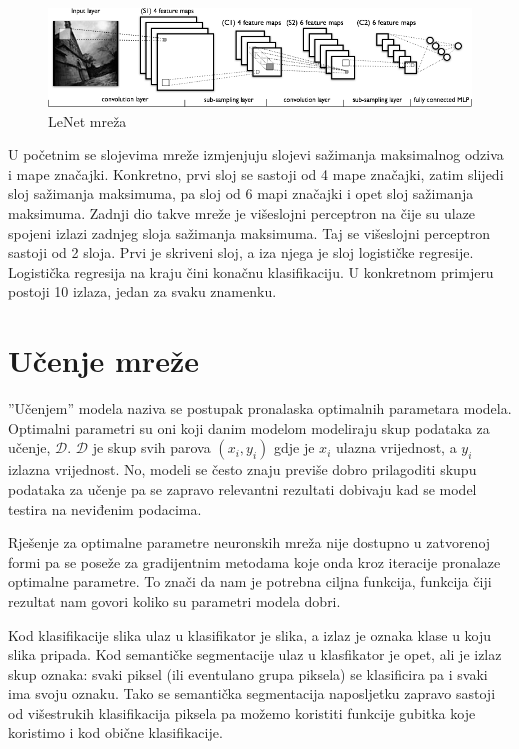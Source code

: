 \documentclass[times, utf8, diplomski, numeric]{fer}
\begin{document}
\begin{figure}[htb]
\centering
\includegraphics[width=\textwidth]{imgs/mylenet.png}
\caption{LeNet mreža}
\label{fig:lenet5}
\end{figure}

U početnim se slojevima mreže izmjenjuju slojevi sažimanja maksimalnog odziva i mape značajki. Konkretno, prvi sloj se sastoji od 4 mape značajki, zatim slijedi sloj sažimanja maksimuma, pa sloj od 6 mapi značajki i opet sloj sažimanja maksimuma. Zadnji dio takve mreže je višeslojni perceptron na čije su ulaze spojeni izlazi zadnjeg sloja sažimanja maksimuma. Taj se višeslojni perceptron sastoji od 2 sloja. Prvi je skriveni sloj, a iza njega je sloj logističke regresije. Logistička regresija na kraju čini konačnu klasifikaciju. U konkretnom primjeru postoji 10 izlaza, jedan za svaku znamenku.

\chapter{Učenje mreže}

''Učenjem'' modela naziva se postupak pronalaska optimalnih parametara modela. Optimalni parametri su oni koji danim modelom modeliraju skup podataka za učenje, $\mathcal{D}$. $\mathcal{D}$ je skup svih parova $(x_i, y_i)$ gdje je $x_i$ ulazna vrijednost, a $y_i$ izlazna vrijednost. No, modeli se često znaju previše dobro prilagoditi skupu podataka za učenje pa se zapravo relevantni rezultati dobivaju kad se model testira na neviđenim podacima.

Rješenje za optimalne parametre neuronskih mreža nije dostupno u zatvorenoj formi pa se poseže za gradijentnim metodama koje onda kroz iteracije pronalaze optimalne parametre. To znači da nam je potrebna ciljna funkcija, funkcija čiji rezultat nam govori koliko su parametri modela dobri.

Kod klasifikacije slika ulaz u klasifikator je slika, a izlaz je oznaka klase u koju slika pripada. Kod semantičke segmentacije ulaz u klasfikator je opet, ali je izlaz skup oznaka: svaki piksel (ili eventulano grupa piksela) se klasificira pa i svaki ima svoju oznaku. Tako se semantička segmentacija naposljetku zapravo sastoji od višestrukih klasifikacija piksela pa možemo koristiti funkcije gubitka koje koristimo i kod obične klasifikacije.
\end{document}
